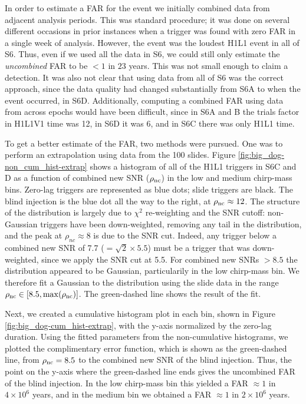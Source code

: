 In order to estimate a \ac{FAR} for the event we initially combined data from adjacent analysis periods. This was standard procedure; it was done on several different occasions in prior instances when a trigger was found with zero \ac{FAR} in a single week of analysis. However, the event was the loudest H1L1 event in all of S6. Thus, even if we used all the data in S6, we could still only estimate the \emph{uncombined} \ac{FAR} to be $< 1$ in $23$ years. This was not small enough to claim a detection. It was also not clear that using data from all of S6 was the correct approach, since the data quality had changed substantially from S6A to when the event occurred, in S6D. Additionally, computing a combined \ac{FAR} using data from across epochs would have been difficult, since in S6A and B the trials factor in H1L1V1 time was 12, in S6D it was 6, and in S6C there was only H1L1 time. 

To get a better estimate of the \ac{FAR}, two methods were pursued. One was to perform an extrapolation using data from the 100 slides. Figure \ref{fig:big_dog-non_cum_hist-extrap} shows a histogram of all of the H1L1 triggers in S6C and D as a function of combined new \ac{SNR} ($\rho_{\mathrm{nc}}$) in the low and medium chirp-mass bins. Zero-lag triggers are represented as blue dots; slide triggers are black. The blind injection is the blue dot all the way to the right, at $\rho_{\mathrm{nc}} \approx 12$. The structure of the distribution is largely due to $\chi^2$ re-weighting and the \ac{SNR} cutoff: non-Gaussian triggers have been down-weighted, removing any tail in the distribution, and the peak at $\rho_{nc} \approx 8$ is due to the \ac{SNR} cut. Indeed, any trigger below a combined new \ac{SNR} of 7.7 ($= \sqrt{2}\times 5.5$) must be a trigger that was down-weighted, since we apply the \ac{SNR} cut at 5.5. For combined new \acp{SNR} $> 8.5$ the distribution appeared to be Gaussian, particularily in the low chirp-mass bin. We therefore fit a Gaussian to the distribution using the slide data in the range $\rho_{\mathrm{nc}} \in [8.5, \max(\rho_{\mathrm{nc}})]$. The green-dashed line shows the result of the fit.

Next, we created a cumulative histogram plot in each bin, shown in Figure \ref{fig:big_dog-cum_hist-extrap}, with the y-axis normalized by the zero-lag duration. Using the fitted parameters from the non-cumulative histograms, we plotted the complimentary error function, which is shown as the green-dashed line, from $\rho_{\mathrm{nc}} = 8.5$ to the combined new \ac{SNR} of the blind injection. Thus, the point on the y-axis where the green-dashed line ends gives the uncombined \ac{FAR} of the blind injection. In the low chirp-mass bin this yielded a \ac{FAR} $\approx 1$ in $4\times 10^{6}$ years, and in the medium bin we obtained a \ac{FAR} $\approx 1$ in $2\times 10^{6}$ years.

